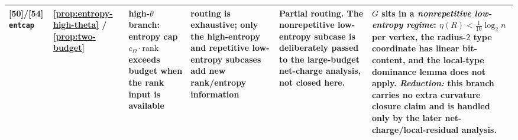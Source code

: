 \documentclass[11pt]{article}
\begin{document}
{\begin{longtable}{L{0.09\textwidth} L{0.095\textwidth} L{0.15\textwidth} L{0.08\textwidth} L{0.105\textwidth} L{0.335\textwidth}}
{[50]}/{[54]} \texttt{entcap} & \cref{prop:entropy-high-theta} / \cref{prop:two-budget} & high-$\theta$ branch: entropy cap $c_\Omega\cdot\mathrm{rank}$ exceeds budget when the rank input is available & routing is exhaustive; only the high-entropy and repetitive low-entropy subcases add new rank/entropy information & \textbf{Partial routing.} The nonrepetitive low-entropy subcase is deliberately passed to the large-budget net-charge analysis, not closed here. & $G$ sits in a \emph{nonrepetitive low-entropy regime}: $\eta(R)<\tfrac1{10}\log_2 n$ per vertex, the radius-$2$ type coordinate has linear bit-content, and the local-type dominance lemma does not apply.  \emph{Reduction:} this branch carries no extra curvature closure claim and is handled only by the later net-charge/local-residual analysis. \\
\bottomrule
\end{longtable}
}
\end{document}
